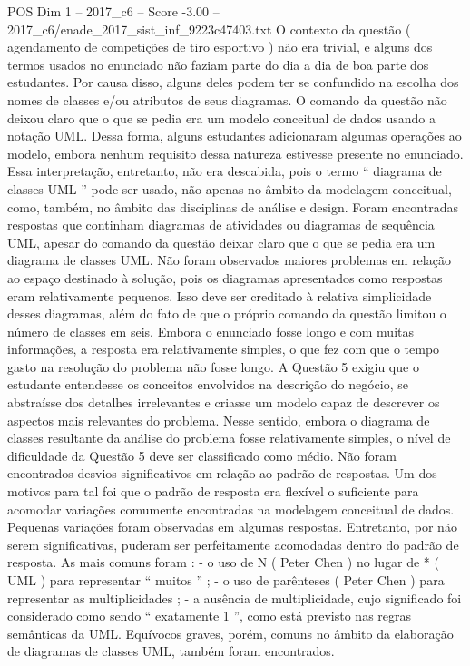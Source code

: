 \begin{textsample}{POS Dim 1 – 2017\_c6 – Score -3.00 – 2017\_c6/enade\_2017\_sist\_inf\_9223c47403.txt}
O contexto da questão ( agendamento de competições de tiro esportivo ) não era trivial, e alguns dos termos usados no enunciado não faziam parte do dia a dia de boa parte dos estudantes.
Por causa disso, alguns deles podem ter se confundido na escolha dos nomes de classes e/ou atributos de seus diagramas.
O comando da questão não deixou claro que o que se pedia era um modelo conceitual de dados usando a notação UML.
Dessa forma, alguns estudantes adicionaram algumas operações ao modelo, embora nenhum requisito dessa natureza estivesse presente no enunciado.
Essa interpretação, entretanto, não era descabida, pois o termo “ diagrama de classes UML ” pode ser usado, não apenas no âmbito da modelagem conceitual, como, também, no âmbito das disciplinas de análise e design.
Foram encontradas respostas que continham diagramas de atividades ou diagramas de sequência UML, apesar do comando da questão deixar claro que o que se pedia era um diagrama de classes UML.
Não foram observados maiores problemas em relação ao espaço destinado à solução, pois os diagramas apresentados como respostas eram relativamente pequenos.
Isso deve ser creditado à relativa simplicidade desses diagramas, além do fato de que o próprio comando da questão limitou o número de classes em seis.
Embora o enunciado fosse longo e com muitas informações, a resposta era relativamente simples, o que fez com que o tempo gasto na resolução do problema não fosse longo.
A Questão 5 exigiu que o estudante entendesse os conceitos envolvidos na descrição do negócio, se abstraísse dos detalhes irrelevantes e criasse um modelo capaz de descrever os aspectos mais relevantes do problema.
Nesse sentido, embora o diagrama de classes resultante da análise do problema fosse relativamente simples, o nível de dificuldade da Questão 5 deve ser classificado como médio.
Não foram encontrados desvios significativos em relação ao padrão de respostas.
Um dos motivos para tal foi que o padrão de resposta era flexível o suficiente para acomodar variações comumente encontradas na modelagem conceitual de dados.
Pequenas variações foram observadas em algumas respostas.
Entretanto, por não serem significativas, puderam ser perfeitamente acomodadas dentro do padrão de resposta.
As mais comuns foram : - o uso de N ( Peter Chen ) no lugar de * ( UML ) para representar “ muitos ” ; - o uso de parênteses ( Peter Chen ) para representar as multiplicidades ; - a ausência de multiplicidade, cujo significado foi considerado como sendo “ exatamente 1 ”, como está previsto nas regras semânticas da UML.
Equívocos graves, porém, comuns no âmbito da elaboração de diagramas de classes UML, também foram encontrados.

\end{textsample}
